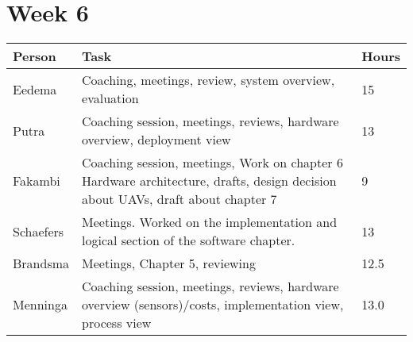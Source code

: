 \section{Week 6}
\begin{tabular}{p{} p{} p{}}
	\textbf{Person} & \textbf{Task}                                                                                                                  & \textbf{Hours} \\ \midrule
	Eedema          & Coaching, meetings, review, system overview, evaluation                                                                        & 15             \\ \midrule
	Putra           & Coaching session, meetings, reviews, hardware overview, deployment view                                                        & 13             \\ \midrule
	Fakambi         & Coaching session, meetings, Work on chapter 6 Hardware architecture, drafts, design decision about UAVs, draft about chapter 7 & 9              \\ \midrule
	Schaefers       & Meetings. Worked on the implementation and logical section of the software chapter.                                            & 13             \\ \midrule
	Brandsma        & Meetings, Chapter 5, reviewing                                                                                                 & 12.5           \\ \midrule
	Menninga        & Coaching session, meetings, reviews, hardware overview (sensors)/costs, implementation view, process view                      & 13.0           \\
	\midrule
\end{tabular}

